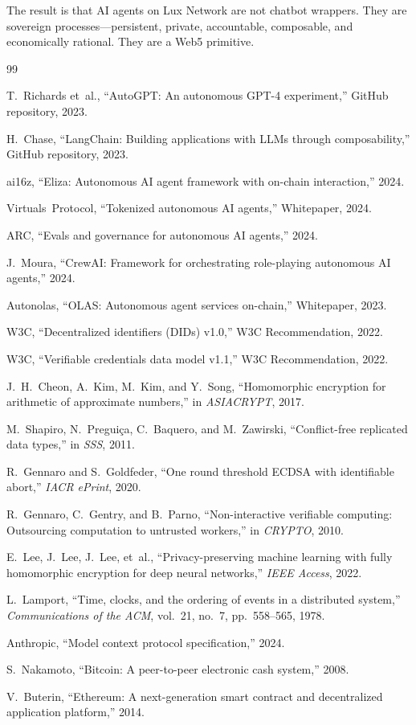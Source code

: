 \documentclass[11pt,a4paper]{article}
\begin{document}
The result is that AI agents on Lux Network are not chatbot wrappers. They are sovereign processes---persistent, private, accountable, composable, and economically rational. They are a Web5 primitive.

\begin{thebibliography}{99}

T.~Richards et~al., ``AutoGPT: An autonomous GPT-4 experiment,'' GitHub repository, 2023.

H.~Chase, ``LangChain: Building applications with LLMs through composability,'' GitHub repository, 2023.

ai16z, ``Eliza: Autonomous AI agent framework with on-chain interaction,'' 2024.

Virtuals~Protocol, ``Tokenized autonomous AI agents,'' Whitepaper, 2024.

ARC, ``Evals and governance for autonomous AI agents,'' 2024.

J.~Moura, ``CrewAI: Framework for orchestrating role-playing autonomous AI agents,'' 2024.

Autonolas, ``OLAS: Autonomous agent services on-chain,'' Whitepaper, 2023.

W3C, ``Decentralized identifiers (DIDs) v1.0,'' W3C Recommendation, 2022.

W3C, ``Verifiable credentials data model v1.1,'' W3C Recommendation, 2022.

J.~H.~Cheon, A.~Kim, M.~Kim, and Y.~Song, ``Homomorphic encryption for arithmetic of approximate numbers,'' in \emph{ASIACRYPT}, 2017.

M.~Shapiro, N.~Pregui\c{c}a, C.~Baquero, and M.~Zawirski, ``Conflict-free replicated data types,'' in \emph{SSS}, 2011.

R.~Gennaro and S.~Goldfeder, ``One round threshold ECDSA with identifiable abort,'' \emph{IACR ePrint}, 2020.

R.~Gennaro, C.~Gentry, and B.~Parno, ``Non-interactive verifiable computing: Outsourcing computation to untrusted workers,'' in \emph{CRYPTO}, 2010.

E.~Lee, J.~Lee, J.~Lee, et~al., ``Privacy-preserving machine learning with fully homomorphic encryption for deep neural networks,'' \emph{IEEE Access}, 2022.

L.~Lamport, ``Time, clocks, and the ordering of events in a distributed system,'' \emph{Communications of the ACM}, vol.~21, no.~7, pp.~558--565, 1978.

Anthropic, ``Model context protocol specification,'' 2024.

S.~Nakamoto, ``Bitcoin: A peer-to-peer electronic cash system,'' 2008.

V.~Buterin, ``Ethereum: A next-generation smart contract and decentralized application platform,'' 2014.

\end{thebibliography}
\end{document}
